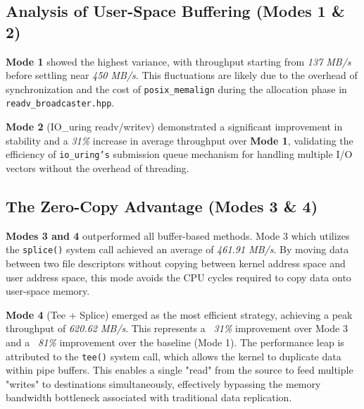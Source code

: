 \documentclass[
	a4paper,
	10pt,
	unnumberedsections,
	twoside, 
]{LTJournalArticle}
\begin{document}
\subsection{Analysis of User-Space Buffering (Modes 1 \& 2)}

\textbf{Mode 1} showed the highest variance, with throughput starting from \textit{137 MB/s} before settling near \textit{450 MB/s}. This fluctuations are likely due to the overhead of synchronization and the cost of \texttt{posix\_memalign} during the allocation phase in \texttt{readv\_broadcaster.hpp}. 

\textbf{Mode 2} (IO\_uring readv/writev) demonstrated a significant improvement in stability and a \textit{31\%} increase in average throughput over \textbf{Mode 1}, validating the efficiency of \texttt{io\_uring's} submission queue mechanism for handling multiple I/O vectors without the overhead of threading.

\subsection{The Zero-Copy Advantage (Modes 3 \& 4)}
\textbf{Modes 3 and 4} outperformed all buffer-based methods. Mode 3 which utilizes the \texttt{splice()} system call achieved an average of \textit{461.91 MB/s}. By moving data between two file descriptors without copying between kernel address space and user address space, this mode avoids the CPU cycles required to copy data onto user-space memory.

\textbf{Mode 4} (Tee + Splice) emerged as the most efficient strategy, achieving a peak throughput of \textit{620.62 MB/s}. This represents a \textit{\textit{~31\%}} improvement over Mode 3 and a \textit{~81\%} improvement over the baseline (Mode 1). The performance leap is attributed to the \texttt{tee()} system call, which allows the kernel to duplicate data within pipe buffers. This enables a single "read" from the source to feed multiple "writes" to destinations simultaneously, effectively bypassing the memory bandwidth bottleneck associated with traditional data replication.
\end{document}
